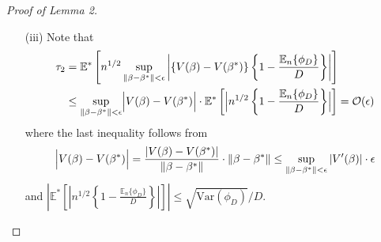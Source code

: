 \documentclass{article}
\newcommand{\pr}{\mathbb{P}}
\newcommand{\E}{\mathbb{E}}
\begin{document}
\begin{proof}[Proof of Lemma 2]
\begin{enumerate}
		
		Since $\mathcal F_\beta$ is a class of linear combinations of indicator functions with dimension at most $2^3$, it is VC-subgraph by Lemma 9.6 and Lemma 9.9 in Kosorok (2008). Therefore, its modified bracketing integral $J_{[]}^*(1, \mathcal F_\beta)$ is finite.
		
		Now, let
		\begin{align*}
			\mathbb G_n \mathcal F_\beta 
			&= n^{1/2}[\pr_n\{ \mathcal F_\beta\} - \pr\{ \mathcal F_\beta \}] \\
			&= n^{1/2}\left[ \pr_n\{ \phi_{N; \beta} - \phi_{N; \beta^*} - D(V(\beta) - V(\beta^*)) \} \right]
		\end{align*}
		be the empirical process indexed by $\beta$. Applying Theorem 11.2 from \cite{kosorok2008} yields
		\begin{align*}
			\tau_1
			&= \mathbb E^* \left[ n^{1/2} \sup_{\|\beta-\beta^*\|<\epsilon} \cdot \left| \mathbb G_n \mathcal F_\beta \right| \right] / D \\
			&\le \ell \cdot J_{[]}^*(1,\mathcal F_\beta) \cdot \|F\|_{\mathbb P, 2} \\
			&\le \ell \cdot J_{[]}^*(1,\mathcal F_\beta) \cdot M (2k_0k_1\epsilon)^{1/2}
		\end{align*}
		for some constant $0 < \ell < \infty.$ Hence, 
		\begin{align}
			\tau_1 \le c_2 := \ell \cdot J_{[]}^*(1,\mathcal F_\beta) \cdot M (2k_0k_1\epsilon)^{1/2} < \infty.
			\label{eq:tau1}
		\end{align}
		
		\item[(iii)]
		Note that
		\begin{align*}
			\tau_2 
			&= \E^*\left[ n^{1/2} \sup_{\|\beta-\beta^*\| < \epsilon} \left| \left\{V(\beta)-V(\beta^*)\right\}\left\{ 1 - \frac{\E_n\{ \phi_D \}}{D} \right\} \right| \right] \\
			&\le \sup_{\|\beta - \beta^*\| < \epsilon} \Bigl|
			   V(\beta) - V(\beta^*) \Bigr| \cdot \mathbb E^*\left[ \Bigl| n^{1/2}\left\{ 1 - \frac{\E_n\{ \phi_D \}}{D} \right\} \Bigr|
			   \right] 
			  = \mathcal O(\epsilon)
		\end{align*}
		where the last inequality follows from
		\begin{align}
			\Bigl| V(\beta) - V(\beta^*) \Bigr|
			= \frac{| V(\beta) - V(\beta^*) |}{\|\beta - \beta^*\|} \cdot \|\beta - \beta^*\| 
			\le \sup_{\|\beta - \beta^*\| < \epsilon}|V'(\beta)| \cdot \epsilon  %
			\label{eq:tau2}
		\end{align}
		and $\left|\mathbb E^*\left[\left|n^{1/2} \left\{1 - \frac{\E_n\{\phi_D\}}{D}\right\}\right|\right]\right| \le \sqrt{\text{Var}(\phi_D)}/D$.
		

\end{enumerate}
\end{proof}
\end{document}
